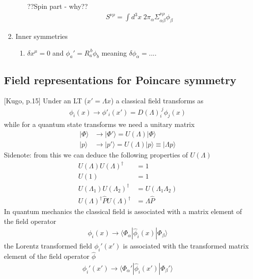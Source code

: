 \documentclass[10pt,a4paper]{report}
\theoremstyle{definition}
\begin{document}
\begin{enumerate}
\begin{enumerate}
??Spin part - why??
\begin{align}
S^{\nu\rho}=\int d^3x\;2\pi_\alpha\Sigma_{\alpha\beta}^{\nu\rho}\phi_\beta
\end{align}

\end{enumerate}
\item Inner symmetries
\begin{enumerate}
\item $\delta x^\mu=0$ and $\phi_a'=R_a^{\,b}\phi_b$ meaning $\delta\phi_\alpha=....$ 
\end{enumerate}

\end{enumerate}


\subsection{Field representations for Poincare symmetry}
[Kugo, p.15]
Under an LT ($x'=\Lambda x$) a classical field transforms as
\begin{align}
\phi_i(x)\rightarrow \phi'_i(x')=D(\Lambda)^{\;j}_i\phi_j(x)
\end{align}
while for a quantum state transforms we need a unitary matrix
\begin{align}
|\Phi\rangle&\rightarrow |\Phi'\rangle=U(\Lambda)|\Phi\rangle\\
|p\rangle&\rightarrow |p'\rangle=U(\Lambda)|p\rangle\equiv|\Lambda p\rangle
\end{align}
Sidenote: from this we can deduce the following properties of $U(\Lambda)$
\begin{align}
U(\Lambda)U(\Lambda)^\dagger&=1\\
U(1)&=1\\
U(\Lambda_1)U(\Lambda_2)^\dagger&=U(\Lambda_1\Lambda_2)\\
U(\Lambda)^\dagger \hat{P}U(\Lambda)^\dagger&=\Lambda\hat{P}
\end{align}
In quantum mechanics the classical field is associated with a matrix element of the field operator
\begin{align}
\phi_i(x)\rightarrow\langle\Phi_\alpha|\hat{\phi}_i(x)|\Phi_\beta\rangle
\end{align}
the Lorentz transformed field $\phi_i'(x')$ is associated with the transformed matrix element of the field operator $\hat{\phi}$
\begin{align}
\phi_i'(x')\rightarrow\langle\Phi_\alpha'|\hat{\phi}_i(x')|\Phi_\beta'\rangle
\end{align}
\end{document}
